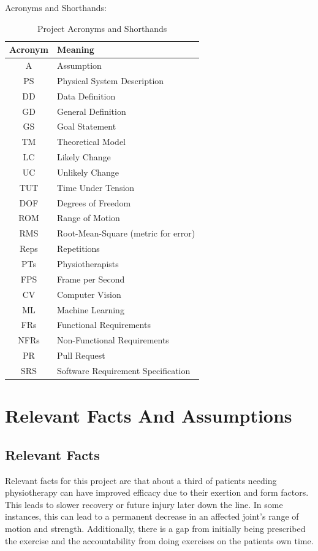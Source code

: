 \documentclass[12pt]{article}
\begin{document}
Acronyms and Shorthands:
\begin{table}[H]
\centering
\begin{tabular}{|c l|}
  \hline
  \textbf{Acronym} & \textbf{Meaning} \\
  \hline
  A & Assumption \\
  PS & Physical System Description \\
  DD & Data Definition \\
  GD & General Definition \\
  GS & Goal Statement \\
  TM & Theoretical Model \\
  LC & Likely Change \\
  UC & Unlikely Change \\
  TUT & Time Under Tension \\
  DOF & Degrees of Freedom \\
  ROM & Range of Motion \\
  RMS & Root-Mean-Square (metric for error) \\
  Reps & Repetitions \\
  PTs & Physiotherapists \\
  FPS & Frame per Second \\
  CV & Computer Vision \\
  ML & Machine Learning \\
  FRs & Functional Requirements\\
  NFRs & Non-Functional Requirements \\
  PR & Pull Request \\
  SRS & Software Requirement Specification \\ \hline
\end{tabular}
\caption{Project Acronyms and Shorthands}
\end{table}

\section{Relevant Facts And Assumptions}
\subsection{Relevant Facts}
Relevant facts for this project are that about a third of patients needing physiotherapy can have improved efficacy due to their exertion and form factors. This leads to slower recovery or future injury later down the line. In some instances, this can lead to a permanent decrease in an affected joint's range of motion and strength. Additionally, there is a gap from initially being prescribed the exercise and the accountability from doing exercises on the patients own time. 
\end{document}
